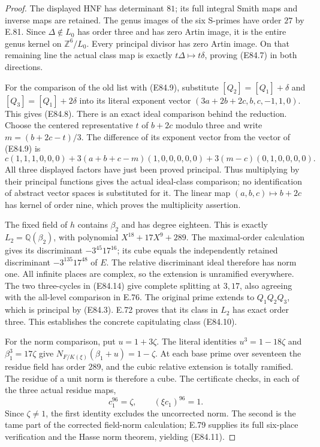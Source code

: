 \begin{proof}
The displayed HNF has determinant \(81\); its full
integral Smith maps and inverse maps are retained.
The genus images of the six S-primes have order
\(27\) by E.81. Since \(\Delta\notin L_0\) has
order three and has zero Artin image, it is the
entire genus kernel on \(\mathbb Z^6/L_0\).
Every principal divisor has zero Artin image.
On that remaining line the actual class map is
exactly \(t\Delta\mapsto t\delta\), proving (E84.7)
in both directions.

For the comparison of the old list with (E84.9),
substitute
\([Q_2]=[Q_1]+\delta\) and
\([Q_3]=[Q_1]+2\delta\) into its literal exponent
vector \((3a+2b+2c,b,c,-1,1,0)\).
This gives (E84.8). There is an exact ideal
comparison behind the reduction. Choose the centered
representative \(t\) of \(b+2c\) modulo three and
write \(m=(b+2c-t)/3\). The difference of its
exponent vector from the vector of (E84.9) is
\[
 c(1,1,1,0,0,0)
 +3(a+b+c-m)(1,0,0,0,0,0)
 +3(m-c)(0,1,0,0,0,0).
 \tag{E84.19}
\]
All three displayed factors have just been proved
principal. Thus multiplying by their principal
functions gives the actual ideal-class comparison;
no identification of abstract vector spaces is
substituted for it. The linear map
\((a,b,c)\mapsto b+2c\) has kernel of order nine,
which proves the multiplicity assertion.

The fixed field of \(h\) contains \(\beta_2\) and
has degree eighteen. This is exactly
\(L_2=\mathbb Q(\beta_2)\), with polynomial
\(X^{18}+17X^9+289\). The maximal-order calculation
gives its discriminant \(-3^{45}17^{16}\);
its cube equals the independently retained
discriminant \(-3^{135}17^{48}\) of \(E\).
The relative discriminant ideal therefore has
norm one. All infinite places are complex, so the
extension is unramified everywhere. The two
three-cycles in (E84.14) give complete splitting
at \(3,17\), also agreeing with the all-level
comparison in E.76. The original prime extends
to \(Q_1Q_2Q_3\), which is principal by (E84.3).
E.72 proves that its class in \(L_2\) has exact
order three. This establishes the concrete
capitulating class (E84.10).

For the norm comparison, put \(u=1+3\zeta\).
The literal identities
\(u^3=1-18\zeta\) and \(\beta_1^3=17\zeta\)
give \(N_{F/K(\xi)}(\beta_1+u)=1-\zeta\).
At each base prime over seventeen the residue
field has order \(289\), and the cubic relative
extension is totally ramified. The residue of a
unit norm is therefore a cube. The certificate
checks, in each of the three actual residue maps,
\[
  c_1^{96}=\zeta,\qquad
  (\xi c_1)^{96}=1 .
 \tag{E84.20}
\]
Since \(\zeta\ne1\), the first identity excludes
the uncorrected norm. The second is the tame
part of the corrected field-norm calculation;
E.79 supplies its full six-place verification and
the Hasse norm theorem, yielding (E84.11).


\end{proof}

